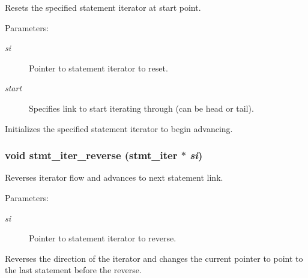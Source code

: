 Resets the specified statement iterator at start point.

\begin{Desc}
\item[Parameters: ]\par
\begin{description}
\item[{\em 
si}]Pointer to statement iterator to reset. \item[{\em 
start}]Specifies link to start iterating through (can be head or tail).\end{description}
\end{Desc}
Initializes the specified statement iterator to begin advancing. 
\subsubsection{\setlength{\rightskip}{0pt plus 5cm}void stmt\_\-iter\_\-reverse ({\bf stmt\_\-iter} $\ast$ {\em si})}\label{iter_8c_a2}


Reverses iterator flow and advances to next statement link.

\begin{Desc}
\item[Parameters: ]\par
\begin{description}
\item[{\em 
si}]Pointer to statement iterator to reverse.\end{description}
\end{Desc}
Reverses the direction of the iterator and changes the current pointer to point to the last statement before the reverse. 